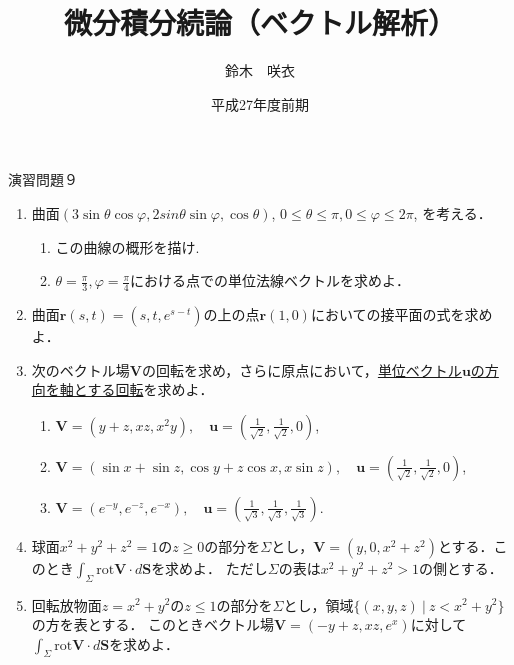\documentclass{jarticle}
\begin{document}
\title{微分積分続論（ベクトル解析）} 
\author{鈴木　咲衣}
\date{平成27年度前期}
\maketitle

\begin{center} {\Large 演習問題９ } \end{center}
\begin{enumerate}
\item \cite[章末問題2.9]{koba}
曲面$(3 \sin \theta \cos \varphi, 2sin \theta \sin \varphi, \cos \theta )$, $0\leq \theta \leq \pi, 0\leq \varphi \leq 2\pi$, を考える．
\begin{enumerate}
\item この曲線の概形を描け.
\item $\theta=\frac{\pi}{3}, \varphi=\frac{\pi}{4}$における点での単位法線ベクトルを求めよ．
\end{enumerate} 
\item \cite[問題2.48]{koba} 
曲面$\bm r(s,t)=(s,t, e^{s-t})$の上の点$\bm r(1,0)$においての接平面の式を求めよ．
\item \cite[問題7.12]{koba} 
次のベクトル場$\bm V$の回転を求め，さらに原点において，\underline{単位ベクトル$\bm u$の方向を軸とする回転}を求めよ．
\begin{enumerate}
\item $\bm V=(y+z, xz, x^2 y ), \quad \bm u=(\frac{1}{\sqrt {2}}, \frac{1}{\sqrt {2}}, 0)$,
\item$\bm V=(\sin x+\sin z, \cos y+z\cos x, x\sin z), \quad \bm u=(\frac{1}{\sqrt {2}}, \frac{1}{\sqrt {2}}, 0)$,
\item $\bm V=(e^{-y}, e^{-z}, e^{-x}), \quad \bm u=(\frac{1}{\sqrt {3}}, \frac{1}{\sqrt {3}}, \frac{1}{\sqrt {3}})$.
\end{enumerate} 

\item \cite[問題8.16]{koba} 
球面$x^{2}+y^{2}+z^{2}=1$の$z\geq 0$の部分を$\Sigma$とし，$\bm V=(y, 0, x^{2}+z^{2})$とする．このとき$\int_{\Sigma}\mathrm{rot} \bm V \cdot d\bm S$を求めよ．
ただし$\Sigma$の表は$x^{2}+y^{2}+z^{2}>1$の側とする．
\item \cite[章末問題8.9]{koba} 
回転放物面$z=x^{2}+y^{2}$の$z\leq 1$の部分を$\Sigma$とし，領域$\{(x,y,z) \ | \ z<  x^{2}+y^{2}\}$の方を表とする．
このときベクトル場$\bm V=(-y+z, xz, e^{x})$に対して$\int_{\Sigma} \mathrm{rot} \bm V \cdot d\bm S$を求めよ．
\end{enumerate}
\newpage
\end{document}
